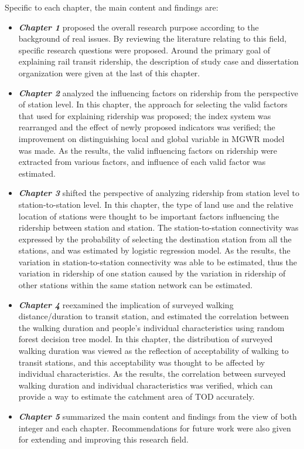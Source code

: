 Specific to each chapter, the main content and findings are:
\begin{itemize}
	\item \emph{\textbf{Chapter 1}} proposed the overall research purpose according to the background of real issues. By reviewing the literature relating to this field, specific research questions were proposed. Around the primary goal of explaining rail transit ridership, the description of study case and dissertation organization were given at the last of this chapter.
	
	\item \emph{\textbf{Chapter 2}} analyzed the influencing factors on ridership from the perspective of station level. In this chapter, the approach for selecting the valid factors that used for explaining ridership was proposed; the index system was rearranged and the effect of newly proposed indicators was verified; the improvement on distinguishing local and global variable in MGWR model was made. As the results, the valid influencing factors on ridership were extracted from various factors, and influence of each valid factor was estimated.
	
	\item \emph{\textbf{Chapter 3}} shifted the perspective of analyzing ridership from station level to station-to-station level. In this chapter, the type of land use and the relative location of stations were thought to be important factors influencing the ridership between station and station. The station-to-station connectivity was expressed by the probability of selecting the destination station from all the stations, and was estimated by logistic regression model. As the results, the variation in station-to-station connectivity was able to be estimated, thus the variation in ridership of one station caused by the variation in ridership of other stations within the same station network can be estimated.
	
	\item \emph{\textbf{Chapter 4}} reexamined the implication of surveyed walking distance/duration to transit station, and estimated the correlation between the walking duration and people's individual characteristics using random forest decision tree model. In this chapter, the distribution of surveyed walking duration was viewed as the reflection of acceptability of walking to transit stations, and this acceptability was thought to be affected by individual characteristics. As the results, the correlation between surveyed walking duration and individual characteristics was verified, which can provide a way to estimate the catchment area of TOD accurately.
	
	\item \emph{\textbf{Chapter 5}} summarized the main content and findings from the view of both integer and each chapter. Recommendations for future work were also given for extending and improving this research field.
\end{itemize}

